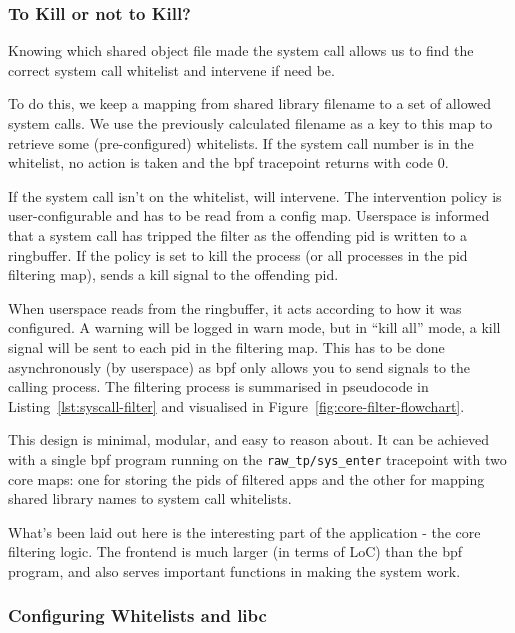 \subsubsection{To Kill or not to Kill?}

Knowing which shared object file made the system call allows us to find the correct
system call whitelist and intervene if need be.

To do this, we keep a mapping from shared library filename to a set of allowed
system calls. We use the previously calculated filename as a key to this map to
retrieve some (pre-configured) whitelists. If the system call number is in the
whitelist, no action is taken and the \ac{bpf} tracepoint returns with code 0.

If the system call isn't on the whitelist, \af will intervene. The intervention
policy is user-configurable and has to be read from a config map. Userspace is
informed that a system call has tripped the filter as the offending \ac{pid} is
written to a ringbuffer. If the policy is set to kill the process (or all 
processes in the \ac{pid} filtering map), \af sends a kill signal to the 
offending \ac{pid}. 

When userspace reads  from the ringbuffer, it acts according to how it was
configured. A warning will be logged in warn mode, but in ``kill all'' mode, a
kill signal will be sent to each \ac{pid} in the filtering map. This has to be
done asynchronously (by userspace) as \ac{bpf} only allows you to send signals
to the calling process. The filtering process is summarised in pseudocode in
Listing~\ref{lst:syscall-filter} and visualised in 
Figure~\ref{fig:core-filter-flowchart}.

This design is minimal, modular, and easy to reason about. It can be achieved
with a single \ac{bpf} program running on the \texttt{raw\_tp/sys\_enter}
tracepoint with two core maps: one for storing the \acp{pid} of filtered apps
and the other for mapping shared library names to system call whitelists.

What's been laid out here is the interesting part of the application
- the core filtering logic. The frontend is much larger (in terms of LoC) than
the \ac{bpf} program, and also serves important functions in making the system
work.

\subsubsection{Configuring Whitelists and \ac{libc}}

